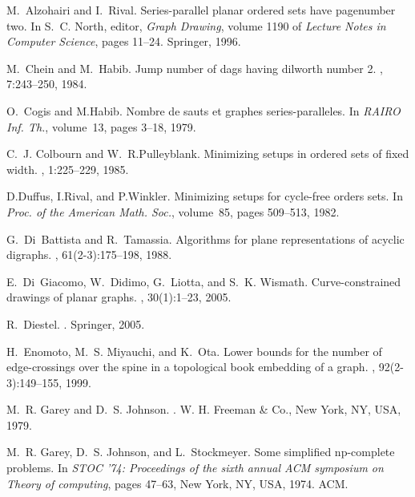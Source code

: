 \documentclass{myllncs-mixalis}
\begin{document}

\begin{thebibliography}{10}

M.~Alzohairi and I.~Rival.
\newblock Series-parallel planar ordered sets have pagenumber two.
\newblock In S.~C. North, editor, {\em Graph Drawing}, volume 1190 of {\em
  Lecture Notes in Computer Science}, pages 11--24. Springer, 1996.

M.~Chein and M.~Habib.
\newblock Jump number of dags having dilworth number 2.
, 7:243--250, 1984.

O.~Cogis and M.Habib.
\newblock Nombre de sauts et graphes series-paralleles.
\newblock In {\em RAIRO Inf. Th.}, volume~13, pages 3--18, 1979.

C.~J. Colbourn and W.~R.Pulleyblank.
\newblock Minimizing setups in ordered sets of fixed width.
, 1:225--229, 1985.

D.Duffus, I.Rival, and P.Winkler.
\newblock Minimizing setups for cycle-free orders sets.
\newblock In {\em Proc. of the American Math. Soc.}, volume~85, pages 509--513,
  1982.

G.~{Di~Battista} and R.~Tamassia.
\newblock Algorithms for plane representations of acyclic digraphs.
, 61(2-3):175--198, 1988.

E.~{Di~Giacomo}, W.~Didimo, G.~Liotta, and S.~K. Wismath.
\newblock Curve-constrained drawings of planar graphs.
, 30(1):1--23, 2005.

R.~Diestel.
.
\newblock Springer, 2005.

H.~Enomoto, M.~S. Miyauchi, and K.~Ota.
\newblock Lower bounds for the number of edge-crossings over the spine in a
  topological book embedding of a graph.
, 92(2-3):149--155, 1999.

M.~R. Garey and D.~S. Johnson.
.
\newblock W. H. Freeman \& Co., New York, NY, USA, 1979.

M.~R. Garey, D.~S. Johnson, and L.~Stockmeyer.
\newblock Some simplified np-complete problems.
\newblock In {\em STOC '74: Proceedings of the sixth annual ACM symposium on
  Theory of computing}, pages 47--63, New York, NY, USA, 1974. ACM.


\end{thebibliography}
\end{document}
